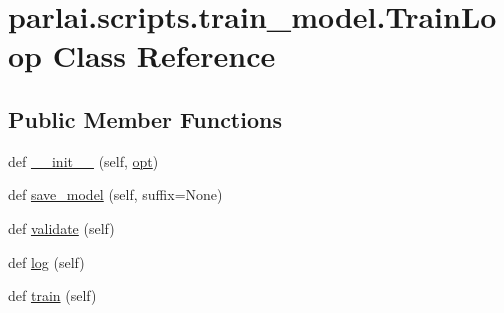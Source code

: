 \hypertarget{classparlai_1_1scripts_1_1train__model_1_1TrainLoop}{}\section{parlai.\+scripts.\+train\+\_\+model.\+Train\+Loop Class Reference}
\label{classparlai_1_1scripts_1_1train__model_1_1TrainLoop}
\subsection*{Public Member Functions}
\begin{DoxyCompactItemize}
\item 
def \hyperlink{classparlai_1_1scripts_1_1train__model_1_1TrainLoop_a87a9194a461efe30e8b4de6cd4036699}{\+\_\+\+\_\+init\+\_\+\+\_\+} (self, \hyperlink{classparlai_1_1scripts_1_1train__model_1_1TrainLoop_a3f9cd4c0c08f457b3ecfd1e494ccf58c}{opt})
\item 
def \hyperlink{classparlai_1_1scripts_1_1train__model_1_1TrainLoop_a352f759a644e87251c37931bf276309a}{save\+\_\+model} (self, suffix=None)
\item 
def \hyperlink{classparlai_1_1scripts_1_1train__model_1_1TrainLoop_a707bb03792ef7427f5ddbb66184a9756}{validate} (self)
\item 
def \hyperlink{classparlai_1_1scripts_1_1train__model_1_1TrainLoop_a8ef64c11f101d087ceb83d21621b9665}{log} (self)
\item 
def \hyperlink{classparlai_1_1scripts_1_1train__model_1_1TrainLoop_a8c15c0d4490891fd3e61e57501474e40}{train} (self)
\end{DoxyCompactItemize}
